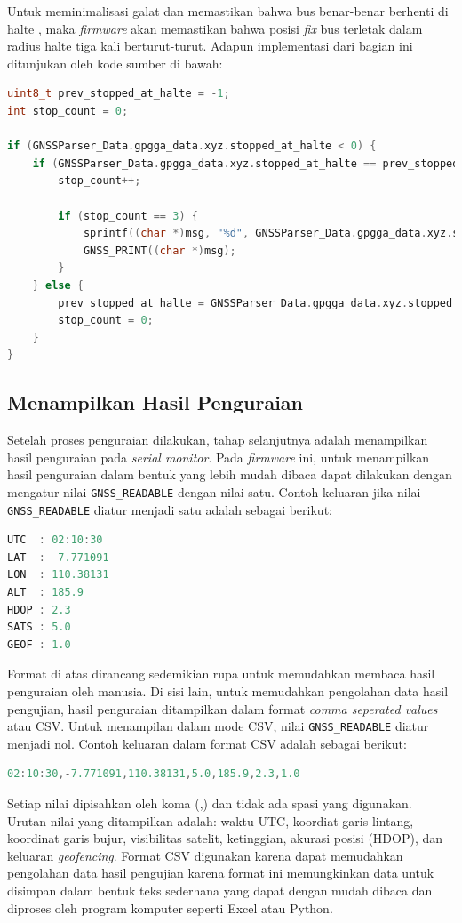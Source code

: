 Untuk meminimalisasi galat dan memastikan bahwa bus benar-benar berhenti di halte , maka \textit{firmware} akan memastikan bahwa posisi \textit{fix} bus terletak dalam radius halte tiga kali berturut-turut. Adapun implementasi dari bagian ini ditunjukan oleh kode sumber di bawah:

\begin{lstlisting}[language=c]
uint8_t prev_stopped_at_halte = -1;
int stop_count = 0; 

if (GNSSParser_Data.gpgga_data.xyz.stopped_at_halte < 0) {
	if (GNSSParser_Data.gpgga_data.xyz.stopped_at_halte == prev_stopped_at_halte) {
		stop_count++; 
		
		if (stop_count == 3) { 
			sprintf((char *)msg, "%d", GNSSParser_Data.gpgga_data.xyz.stopped_at_halte);
			GNSS_PRINT((char *)msg);
		}
	} else {
		prev_stopped_at_halte = GNSSParser_Data.gpgga_data.xyz.stopped_at_halte;
		stop_count = 0; 
	}
}
\end{lstlisting}

\subsection{Menampilkan Hasil Penguraian}
Setelah proses penguraian dilakukan, tahap selanjutnya adalah menampilkan hasil penguraian pada \textit{serial monitor}. Pada \textit{firmware} ini, untuk menampilkan hasil penguraian dalam bentuk yang lebih mudah dibaca dapat dilakukan dengan mengatur nilai \texttt{GNSS\_READABLE} dengan nilai satu. Contoh keluaran jika nilai \texttt{GNSS\_READABLE} diatur menjadi satu adalah sebagai berikut:
\begin{lstlisting}[language=c]
UTC  : 02:10:30
LAT  : -7.771091
LON  : 110.38131
ALT  : 185.9
HDOP : 2.3
SATS : 5.0
GEOF : 1.0
\end{lstlisting}

Format di atas dirancang sedemikian rupa untuk memudahkan membaca hasil penguraian oleh manusia. Di sisi lain, untuk memudahkan pengolahan data hasil pengujian, hasil penguraian ditampilkan dalam format \textit{comma seperated values} atau CSV. Untuk menampilan dalam mode CSV, nilai \texttt{GNSS\_READABLE} diatur menjadi nol. Contoh keluaran dalam format CSV adalah sebagai berikut:

\begin{lstlisting}[language=c]
02:10:30,-7.771091,110.38131,5.0,185.9,2.3,1.0
\end{lstlisting}

Setiap nilai dipisahkan oleh koma (,) dan tidak ada spasi yang digunakan. Urutan nilai yang ditampilkan adalah: waktu UTC, koordiat garis lintang, koordinat garis bujur, visibilitas satelit, ketinggian, akurasi posisi (HDOP), dan keluaran \textit{geofencing}. Format CSV digunakan karena dapat memudahkan pengolahan data hasil pengujian karena format ini memungkinkan data untuk disimpan dalam bentuk teks sederhana yang dapat dengan mudah dibaca dan diproses oleh program komputer seperti Excel atau Python.

